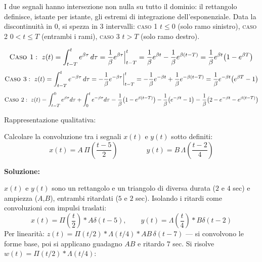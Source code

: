 \documentclass[12pt, a4paper]{article}
\begin{document}
I due segnali hanno intersezione non nulla su tutto il dominio: il rettangolo definisce, istante per istante, gli estremi di integrazione dell'esponenziale. Data la discontinuità in $0$, si spezza in 3 intervalli: \textsc{caso 1} $t\le0$ (solo ramo sinistro), \textsc{caso 2} $0<t\le T$ (entrambi i rami), \textsc{caso 3} $t>T$ (solo ramo destro).

$$\textsc{Caso 1}:\ z(t)=\int_{t-T}^{t}e^{\beta\tau}\,d\tau = \frac1\beta e^{\beta\tau}\Big|_{t-T}^{t} = \frac1\beta e^{\beta t}-\frac1\beta e^{\beta(t-T)} = \frac1\beta e^{\beta t}\big(1-e^{\beta T}\big)$$
$$\textsc{Caso 3}:\ z(t)=\int_{t-T}^{t}e^{-\beta\tau}\,d\tau = -\frac1\beta e^{-\beta\tau}\Big|_{t-T}^{t} = -\frac1\beta e^{-\beta t}+\frac1\beta e^{-\beta(t-T)} = \frac1\beta e^{-\beta t}\big(e^{\beta T}-1\big)$$
$$\textsc{Caso 2}:\ z(t)=\int_{t-T}^{0}e^{\beta\tau}d\tau+\int_0^{t}e^{-\beta\tau}d\tau = \frac1\beta\big(1-e^{\beta(t-T)}\big)-\frac1\beta\big(e^{-\beta t}-1\big) = \frac1\beta\big(2-e^{-\beta t}-e^{\beta(t-T)}\big)$$

Rappresentazione qualitativa:

\begin{center}
\end{center}

\bigskip

\begin{tcolorbox}[colback=lightergray!10, colframe=tocsec, title=\textbf{Esercizio 2}]
Calcolare la convoluzione tra i segnali $x(t)$ e $y(t)$ sotto definiti:
$$x(t) = A\,\Pi\!\left(\frac{t-5}{2}\right) \qquad\qquad y(t) = B\,\Lambda\!\left(\frac{t-2}{4}\right)$$
\end{tcolorbox}

\textbf{Soluzione:}

$x(t)$ e $y(t)$ sono un rettangolo e un triangolo di diversa durata ($2$ e $4$ sec) e ampiezza ($A$,$B$), entrambi ritardati ($5$ e $2$ sec). Isolando i ritardi come convoluzioni con impulsi traslati:
$$x(t)=\Pi\!\left(\frac t2\right)*A\delta(t-5), \qquad y(t)=\Lambda\!\left(\frac t4\right)*B\delta(t-2)$$
Per linearità: $z(t)=\Pi(t/2)*\Lambda(t/4)*AB\,\delta(t-7)$ — si convolvono le forme base, poi si applicano guadagno $AB$ e ritardo $7$ sec. Si risolve $w(t)=\Pi(t/2)*\Lambda(t/4)$:
\end{document}
